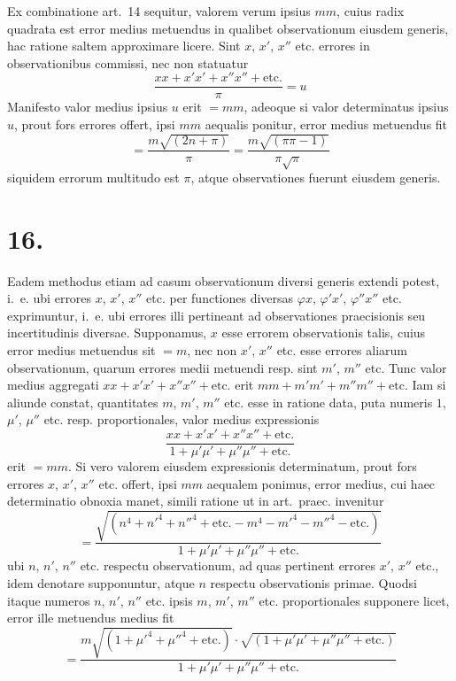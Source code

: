 \documentclass[12pt,a4paper]{book}
\begin{document}
Ex combinatione art.~14 sequitur, valorem verum ipsius $mm$, cuius radix quadrata est error medius metuendus in qualibet observationum eiusdem generis, hac ratione saltem approximare licere. Sint $x$, $x'$, $x''$ etc. errores in observationibus commissi, nec non statuatur
%
\begin{equation*}
\frac{xx+x'x'+x''x''+\text{etc.}}{\pi}=u
\end{equation*}
Manifesto valor medius ipsius $u$ erit $=mm$, adeoque si valor determinatus ipsius $u$, prout fors errores offert, ipsi $mm$ aequalis ponitur, error medius metuendus fit
%
\begin{equation*}
=\frac{m\sqrt{(2n+\pi)}}{\pi}=\frac{m\sqrt{(\pi\pi-1)}}{\pi\sqrt{\pi}}
\end{equation*}
siquidem errorum multitudo est $\pi$, atque observationes fuerunt eiusdem generis.

\section*{16.}
\label{sec:art16}

Eadem methodus etiam ad casum observationum diversi generis extendi potest, i.~e. ubi errores $x$, $x'$, $x''$ etc. per functiones diversas $\varphi x$, $\varphi'x'$, $\varphi''x''$ etc. exprimuntur, i.~e. ubi errores illi pertineant ad observationes praecisionis seu incertitudinis diversae. Supponamus, $x$ esse errorem observationis talis, cuius error medius metuendus sit $=m$, nec non $x'$, $x''$ etc. esse errores aliarum observationum, quarum errores medii metuendi resp. sint $m'$, $m''$ etc. Tunc valor medius aggregati $xx+x'x'+x''x''+\text{etc.}$ erit $mm+m'm'+m''m''+\text{etc.}$ Iam si aliunde constat, quantitates $m$, $m'$, $m''$ etc. esse in ratione data, puta numeris $1$, $\mu'$, $\mu''$ etc. resp. proportionales, valor medius expressionis
%
\begin{equation*}
\frac{xx+x'x'+x''x''+\text{etc.}}{1+\mu'\mu'+\mu''\mu''+\text{etc.}}
\end{equation*}
erit $=mm$. Si vero valorem eiusdem expressionis determinatum, prout fors errores $x$, $x'$, $x''$ etc. offert, ipsi $mm$ aequalem ponimus, error medius, cui haec determinatio obnoxia manet, simili ratione ut in art.~praec. invenitur
%
\begin{equation*}
=\frac{\sqrt{(n^4+n'^4+n''^4+\text{etc.}-m^4-m'^4-m''^4-\text{etc.})}}{1+\mu'\mu'+\mu''\mu''+\text{etc.}}
\end{equation*}
ubi $n$, $n'$, $n''$ etc. respectu observationum, ad quas pertinent errores $x'$, $x''$ etc., idem denotare supponuntur, atque $n$ respectu observationis primae. Quodsi itaque numeros $n$, $n'$, $n''$ etc. ipsis $m$, $m'$, $m''$ etc. proportionales supponere licet, error ille metuendus medius fit
%
\begin{equation*}
=\frac{m\sqrt{(1+\mu'^4+\mu''^4+\text{etc.})}\cdot\sqrt{(1+\mu'\mu'+\mu''\mu''+\text{etc.})}}{1+\mu'\mu'+\mu''\mu''+\text{etc.}}
\end{equation*}
\end{document}
